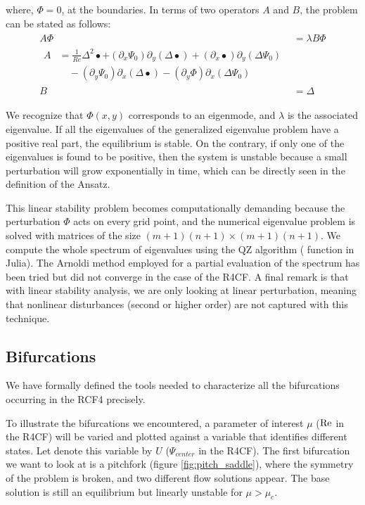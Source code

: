 where, $\Phi = 0$, at the boundaries. In terms of two operators $A$ and $B$,
the problem can be stated as follows: 
\begin{align} \label{eq:eig_prob}
  \begin{split}
  A \Phi & = \lambda B \Phi \\[4pt]
  \begin{split}
  A & = \frac{1}{Re} \Delta^2 \bullet
    + (\partial_x \Psi_0) \partial_y (\Delta \bullet)
    + (\partial_x \bullet) \partial_y (\Delta \Psi_0) \\
    &\quad - (\partial_y \Psi_0) \partial_x (\Delta \bullet)
    - (\partial_y \Phi) \partial_x (\Delta \Psi_0)
  \end{split} \\
  B & = \Delta
  \end{split}
\end{align}

We recognize that $\Phi(x,y)$ corresponds to an eigenmode, and $\lambda$ is the
associated eigenvalue. If all the eigenvalues of the generalized eigenvalue
problem have a positive real part, the equilibrium is stable. On the contrary,
if only one of the eigenvalues is found to be positive, then the system is
unstable because a small perturbation will grow exponentially in time, which
can be directly seen in the definition of the Ansatz.

This linear stability problem becomes computationally demanding because the
perturbation $\Phi$ acts on every grid point, and the numerical eigenvalue
problem is solved with matrices of the size $(m+1)(n+1) \times (m+1)(n+1)$. We
compute the whole spectrum of eigenvalues using the QZ algorithm (
function in Julia). The Arnoldi
method employed for a partial evaluation of the spectrum has been tried but
did not converge in the case of the R4CF. A final remark is that with linear
stability analysis, we are only looking at linear perturbation, meaning that
nonlinear disturbances (second or higher order) are not captured with this
technique.

\subsection{Bifurcations} \label{sec:bif_details}

We have formally defined the tools needed to characterize all the bifurcations
occurring in the RCF4 precisely. 

To illustrate the bifurcations we encountered, a parameter of interest $\mu$
($\mathrm{Re}$ in the R4CF) will be varied and plotted against a variable that
identifies different states. Let denote this variable by $U$ ($\Psi_{center}$
in the R4CF). The first bifurcation we want to look at is a pitchfork (figure
\ref{fig:pitch_saddle}), where the symmetry of the problem is broken, and two
different flow solutions appear. The base solution is still an equilibrium but
linearly unstable for $\mu > \mu_c$.

